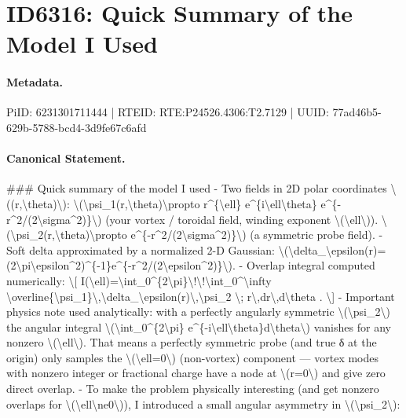 \section*{ID6316: Quick Summary of the Model I Used}
\paragraph{Metadata.}
PiID: 6231301711444 | RTEID: RTE:P24526.4306:T2.7129 | UUID: 77ad46b5-629b-5788-bcd4-3d9fe67c6afd

\paragraph{Canonical Statement.}
\#\#\# Quick summary of the model I used - Two fields in 2D polar coordinates \textbackslash{}((r,\textbackslash{}theta)\textbackslash{}): \textbackslash{}(\textbackslash{}psi\_1(r,\textbackslash{}theta)\textbackslash{}propto r\textasciicircum{}\{\textbackslash{}ell\} e\textasciicircum{}\{i\textbackslash{}ell\textbackslash{}theta\} e\textasciicircum{}\{-r\textasciicircum{}2/(2\textbackslash{}sigma\textasciicircum{}2)\}\textbackslash{}) (your vortex / toroidal field, winding exponent \textbackslash{}(\textbackslash{}ell\textbackslash{})). \textbackslash{}(\textbackslash{}psi\_2(r,\textbackslash{}theta)\textbackslash{}propto e\textasciicircum{}\{-r\textasciicircum{}2/(2\textbackslash{}sigma\textasciicircum{}2)\}\textbackslash{}) (a symmetric probe field). - Soft delta approximated by a normalized 2-D Gaussian: \textbackslash{}(\textbackslash{}delta\_\textbackslash{}epsilon(r)=(2\textbackslash{}pi\textbackslash{}epsilon\textasciicircum{}2)\textasciicircum{}\{-1\}e\textasciicircum{}\{-r\textasciicircum{}2/(2\textbackslash{}epsilon\textasciicircum{}2)\}\textbackslash{}). - Overlap integral computed numerically: \textbackslash{}[ I(\textbackslash{}ell)=\textbackslash{}int\_0\textasciicircum{}\{2\textbackslash{}pi\}\textbackslash{}!\textbackslash{}!\textbackslash{}int\_0\textasciicircum{}\textbackslash{}infty \textbackslash{}overline\{\textbackslash{}psi\_1\}\textbackslash{},\textbackslash{}delta\_\textbackslash{}epsilon(r)\textbackslash{},\textbackslash{}psi\_2 \textbackslash{}; r\textbackslash{},dr\textbackslash{},d\textbackslash{}theta . \textbackslash{}] - Important physics note used analytically: with a perfectly angularly symmetric \textbackslash{}(\textbackslash{}psi\_2\textbackslash{}) the angular integral \textbackslash{}(\textbackslash{}int\_0\textasciicircum{}\{2\textbackslash{}pi\} e\textasciicircum{}\{-i\textbackslash{}ell\textbackslash{}theta\}d\textbackslash{}theta\textbackslash{}) vanishes for any nonzero \textbackslash{}(\textbackslash{}ell\textbackslash{}). That means a perfectly symmetric probe (and true δ at the origin) only samples the \textbackslash{}(\textbackslash{}ell=0\textbackslash{}) (non-vortex) component — vortex modes with nonzero integer or fractional charge have a node at \textbackslash{}(r=0\textbackslash{}) and give zero direct overlap. - To make the problem physically interesting (and get nonzero overlaps for \textbackslash{}(\textbackslash{}ell\textbackslash{}ne0\textbackslash{})), I introduced a small angular asymmetry in \textbackslash{}(\textbackslash{}psi\_2\textbackslash{}): 